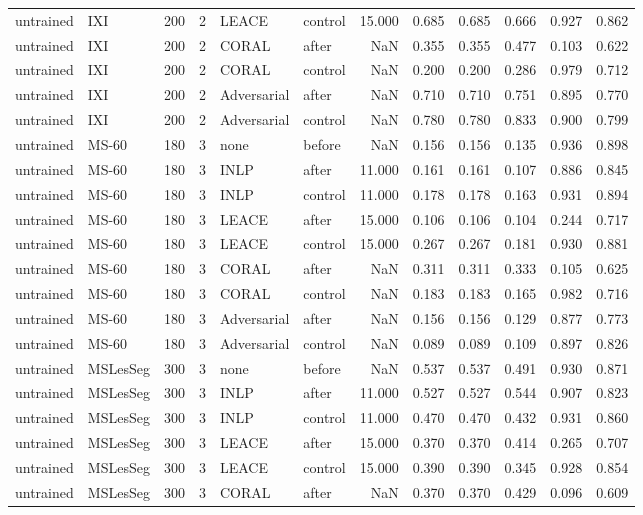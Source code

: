 \begin{tabular}{llrrllrrrrrr}
untrained & IXI & 200 & 2 & LEACE & control & 15.000 & 0.685 & 0.685 & 0.666 & 0.927 & 0.862 \\
untrained & IXI & 200 & 2 & CORAL & after & NaN & 0.355 & 0.355 & 0.477 & 0.103 & 0.622 \\
untrained & IXI & 200 & 2 & CORAL & control & NaN & 0.200 & 0.200 & 0.286 & 0.979 & 0.712 \\
untrained & IXI & 200 & 2 & Adversarial & after & NaN & 0.710 & 0.710 & 0.751 & 0.895 & 0.770 \\
untrained & IXI & 200 & 2 & Adversarial & control & NaN & 0.780 & 0.780 & 0.833 & 0.900 & 0.799 \\
untrained & MS-60 & 180 & 3 & none & before & NaN & 0.156 & 0.156 & 0.135 & 0.936 & 0.898 \\
untrained & MS-60 & 180 & 3 & INLP & after & 11.000 & 0.161 & 0.161 & 0.107 & 0.886 & 0.845 \\
untrained & MS-60 & 180 & 3 & INLP & control & 11.000 & 0.178 & 0.178 & 0.163 & 0.931 & 0.894 \\
untrained & MS-60 & 180 & 3 & LEACE & after & 15.000 & 0.106 & 0.106 & 0.104 & 0.244 & 0.717 \\
untrained & MS-60 & 180 & 3 & LEACE & control & 15.000 & 0.267 & 0.267 & 0.181 & 0.930 & 0.881 \\
untrained & MS-60 & 180 & 3 & CORAL & after & NaN & 0.311 & 0.311 & 0.333 & 0.105 & 0.625 \\
untrained & MS-60 & 180 & 3 & CORAL & control & NaN & 0.183 & 0.183 & 0.165 & 0.982 & 0.716 \\
untrained & MS-60 & 180 & 3 & Adversarial & after & NaN & 0.156 & 0.156 & 0.129 & 0.877 & 0.773 \\
untrained & MS-60 & 180 & 3 & Adversarial & control & NaN & 0.089 & 0.089 & 0.109 & 0.897 & 0.826 \\
untrained & MSLesSeg & 300 & 3 & none & before & NaN & 0.537 & 0.537 & 0.491 & 0.930 & 0.871 \\
untrained & MSLesSeg & 300 & 3 & INLP & after & 11.000 & 0.527 & 0.527 & 0.544 & 0.907 & 0.823 \\
untrained & MSLesSeg & 300 & 3 & INLP & control & 11.000 & 0.470 & 0.470 & 0.432 & 0.931 & 0.860 \\
untrained & MSLesSeg & 300 & 3 & LEACE & after & 15.000 & 0.370 & 0.370 & 0.414 & 0.265 & 0.707 \\
untrained & MSLesSeg & 300 & 3 & LEACE & control & 15.000 & 0.390 & 0.390 & 0.345 & 0.928 & 0.854 \\
untrained & MSLesSeg & 300 & 3 & CORAL & after & NaN & 0.370 & 0.370 & 0.429 & 0.096 & 0.609 \\

\end{tabular}
